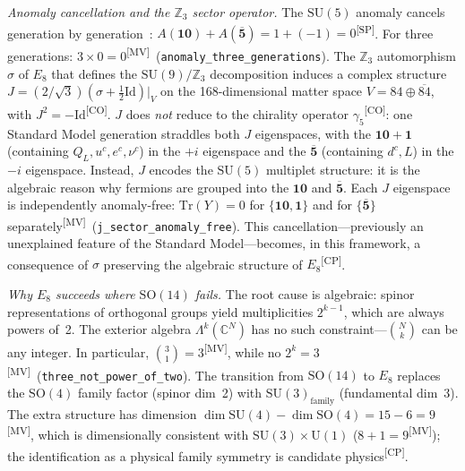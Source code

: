 \documentclass[aps,prl,twocolumn,showpacs,preprintnumbers,superscriptaddress,floatfix]{revtex4-2}
\newcommand{\Tr}{\mathrm{Tr}}
\newcommand{\MV}{\textsuperscript{[MV]}}
\newcommand{\CO}{\textsuperscript{[CO]}}
\newcommand{\CP}{\textsuperscript{[CP]}}
\newcommand{\SP}{\textsuperscript{[SP]}}
\begin{document}
\emph{Anomaly cancellation and the $\mathbb{Z}_3$ sector operator.}
The $\mathrm{SU}(5)$ anomaly cancels generation by generation~\cite{georgi1982,baez2010}:
$A(\mathbf{10}) + A(\overline{\mathbf{5}}) = 1 + (-1) = 0$\SP.
For three generations: $3 \times 0 = 0$\MV\
(\texttt{anomaly\_three\_generations}).
The $\mathbb{Z}_3$ automorphism $\sigma$ of $E_8$ that defines the
$\mathrm{SU}(9)/\mathbb{Z}_3$ decomposition induces a complex structure
$J = (2/\sqrt{3})(\sigma + \tfrac{1}{2}\mathrm{Id})|_V$ on the
168-dimensional matter space $V = 84 \oplus \overline{84}$, with
$J^2 = -\mathrm{Id}$\CO.
$J$ does \emph{not} reduce to the chirality operator $\gamma_5$\CO:
one Standard Model generation straddles both $J$ eigenspaces, with the
$\mathbf{10} + \mathbf{1}$ (containing $Q_L, u^c, e^c, \nu^c$) in the
$+i$ eigenspace and the $\overline{\mathbf{5}}$ (containing $d^c, L$) in
the $-i$ eigenspace.
Instead, $J$ encodes the $\mathrm{SU}(5)$ multiplet structure:
it is the algebraic reason why fermions are grouped into the
$\mathbf{10}$ and $\overline{\mathbf{5}}$.
Each $J$ eigenspace is independently anomaly-free:
$\Tr(Y) = 0$ for $\{\mathbf{10},\mathbf{1}\}$ and for
$\{\overline{\mathbf{5}}\}$ separately\MV\
(\texttt{j\_sector\_anomaly\_free}).
This cancellation---previously an unexplained
feature of the Standard Model---becomes, in this framework,
a consequence of $\sigma$ preserving the algebraic structure
of $E_8$\CP.

\emph{Why $E_8$ succeeds where $\mathrm{SO}(14)$ fails.}
The root cause is algebraic: spinor representations of orthogonal
groups yield multiplicities $2^{k-1}$, which are always powers
of~2.  The exterior algebra $\Lambda^k(\mathbb{C}^N)$ has no such
constraint---$\binom{N}{k}$ can be any integer.
In particular, $\binom{3}{1} = 3$\MV, while no $2^k = 3$\MV\
(\texttt{three\_not\_power\_of\_two}).
The transition from $\mathrm{SO}(14)$ to $E_8$ replaces the $\mathrm{SO}(4)$ family
factor (spinor dim~2) with $\mathrm{SU}(3)_\text{family}$ (fundamental
dim~3).  The extra structure has dimension $\dim \mathrm{SU}(4) -
\dim \mathrm{SO}(4) = 15 - 6 = 9$\MV, which is dimensionally
consistent with $\mathrm{SU}(3) \times \mathrm{U}(1)$
($8 + 1 = 9$\MV); the identification as a physical family
symmetry is candidate physics\CP.
\end{document}
